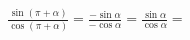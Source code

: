 \documentclass[preview]{standalone}
\begin{document}
\begin{align*}
\frac{\sin(\pi+\alpha)}{\cos(\pi+\alpha)} = \frac{-\sin\alpha}{-\cos\alpha} = \frac{\sin\alpha}{\cos\alpha} =
\end{align*}
\end{document}
